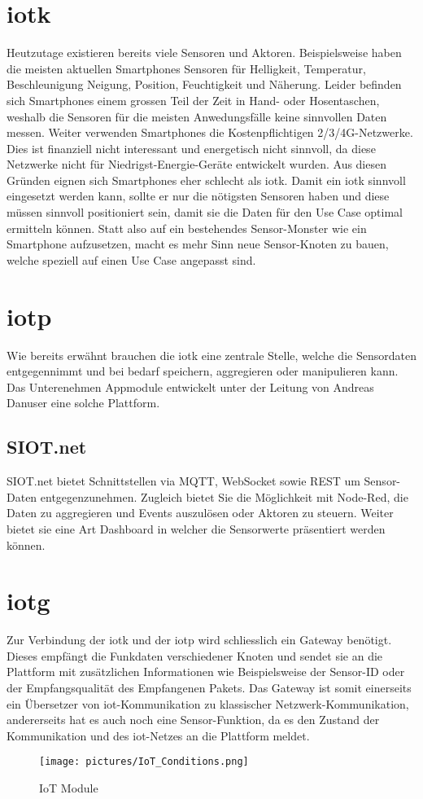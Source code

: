 \section{\gls{iotk}}
Heutzutage existieren bereits viele Sensoren und Aktoren. Beispielsweise haben die meisten aktuellen Smartphones Sensoren für Helligkeit, Temperatur, Beschleunigung Neigung, Position, Feuchtigkeit und Näherung. Leider befinden sich Smartphones einem grossen Teil der Zeit in Hand- oder Hosentaschen, weshalb die Sensoren für die meisten Anwedungsfälle keine sinnvollen Daten messen. Weiter verwenden  Smartphones die Kostenpflichtigen 2/3/4G-Netzwerke. Dies ist finanziell nicht interessant und energetisch nicht sinnvoll, da diese Netzwerke nicht für Niedrigst-Energie-Geräte entwickelt wurden. Aus diesen Gründen eignen sich Smartphones eher schlecht als \gls{iotk}. Damit ein \gls{iotk} sinnvoll eingesetzt werden kann, sollte er nur die nötigsten Sensoren haben und diese müssen sinnvoll positioniert sein, damit sie die Daten für den Use Case optimal ermitteln können. Statt also auf ein bestehendes Sensor-Monster wie ein Smartphone aufzusetzen, macht es mehr Sinn neue Sensor-Knoten zu bauen, welche speziell auf einen Use Case angepasst sind.

\section{\gls{iotp}}
Wie bereits erwähnt brauchen die \gls{iotk} eine zentrale Stelle, welche die Sensordaten entgegennimmt und bei bedarf speichern, aggregieren oder manipulieren kann. Das Unterenehmen Appmodule entwickelt unter der Leitung von Andreas Danuser eine solche Plattform. 
\subsection{SIOT.net}
SIOT.net bietet Schnittstellen via MQTT, WebSocket sowie REST um Sensor-Daten entgegenzunehmen. Zugleich bietet Sie die Möglichkeit mit Node-Red, die Daten zu aggregieren und Events auszulösen oder Aktoren zu steuern. Weiter bietet sie eine Art Dashboard in welcher die Sensorwerte präsentiert werden können.

\section{\gls{iotg}}
Zur Verbindung der \gls{iotk} und der \gls{iotp} wird schliesslich ein Gateway benötigt. Dieses empfängt die Funkdaten verschiedener Knoten und sendet sie an die Plattform mit zusätzlichen Informationen wie Beispielsweise der Sensor-ID oder der Empfangsqualität des Empfangenen Pakets. Das Gateway ist somit einerseits ein Übersetzer von \gls{iot}-Kommunikation zu klassischer Netzwerk-Kommunikation, andererseits hat es auch noch eine Sensor-Funktion, da es den Zustand der Kommunikation und des \gls{iot}-Netzes an die Plattform meldet. 

\begin{figure}[H]
    \centering
        \texttt{[image: pictures/IoT\_Conditions.png]}
    \caption{IoT Module}
    \label{fig:IoT Module}
\end{figure}